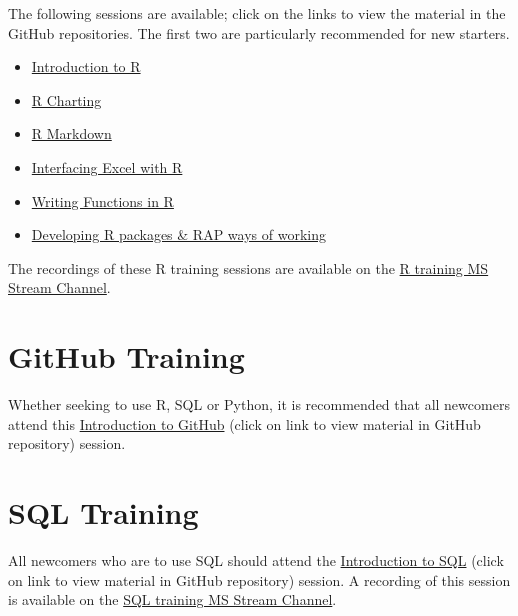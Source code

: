 \documentclass[
]{book}
\providecommand{\tightlist}{%
  \setlength{\itemsep}{0pt}\setlength{\parskip}{0pt}}
\begin{document}
The following sessions are available; click on the links to view the material in the GitHub repositories. The first two are particularly recommended for new starters.

\begin{itemize}
\tightlist
\item
  \href{https://github.com/moj-analytical-services/IntroRTraining}{Introduction to R}
\item
  \href{https://github.com/moj-analytical-services/ggplotTraining}{R Charting}
\item
  \href{https://github.com/moj-analytical-services/rmarkdown_training}{R Markdown}
\item
  \href{https://github.com/moj-analytical-services/r-excel-training}{Interfacing Excel with R}
\item
  \href{https://github.com/moj-analytical-services/writing_functions_in_r}{Writing Functions in R}
\item
  \href{https://github.com/moj-analytical-services/rpackage_training}{Developing R packages \& RAP ways of working}
\end{itemize}

The recordings of these R training sessions are available on the \href{https://web.microsoftstream.com/channel/aa3cda5d-99d6-4e9d-ac5e-6548dd55f52a}{R training MS Stream Channel}.

\hypertarget{github-training}{%
\section{GitHub Training}\label{github-training}}

Whether seeking to use R, SQL or Python, it is recommended that all newcomers attend this \href{https://github.com/moj-analytical-services/git-training-class}{Introduction to GitHub} (click on link to view material in GitHub repository) session.

\hypertarget{sql-training}{%
\section{SQL Training}\label{sql-training}}

All newcomers who are to use SQL should attend the \href{https://github.com/moj-analytical-services/sql_training}{Introduction to SQL} (click on link to view material in GitHub repository) session. A recording of this session is available on the \href{https://web.microsoftstream.com/channel/7cd1cdaf-79cb-4e1e-ab2b-448d8f69f6a1}{SQL training MS Stream Channel}.
\end{document}
